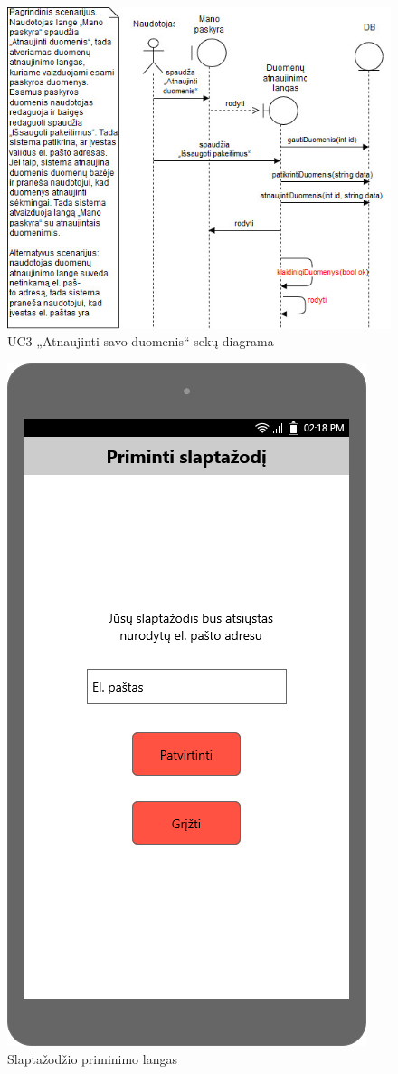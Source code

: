\documentclass{VUMIFPSbakalaurinis}
\begin{document}
\begin{figure}[H]
	\centering
	\includegraphics[scale=0.6]{img/Sequence/3sequence}
	\caption{UC3 „Atnaujinti savo duomenis“ sekų diagrama}
	\label{img:uc3seq}
\end{figure}

\begin{figure}[H]
	\centering
	\includegraphics[scale=0.4]{img/ScreenShots/03-Slaptažodžio-priminimo-langas}
	\caption{Slaptažodžio priminimo langas}
	\label{img:forget pass}
\end{figure}
\end{document}
